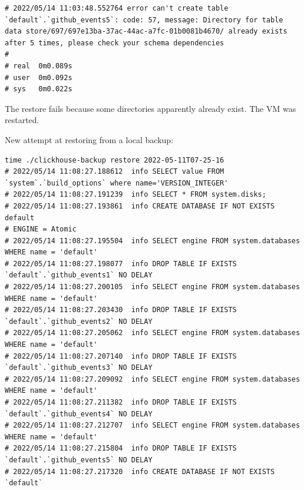 \begin{verbatim}
# 2022/05/14 11:03:48.552764 error can't create table `default`.`github_events5`: code: 57, message: Directory for table data store/697/697e13ba-37ac-44ac-a7fc-01b0081b4670/ already exists after 5 times, please check your schema dependencies
#
# real	0m0.089s
# user	0m0.092s
# sys	0m0.022s
\end{verbatim}

The restore fails because some directories apparently already exist.
The VM was restarted.

New attempt at restoring from a local backup:
\begin{verbatim}
time ./clickhouse-backup restore 2022-05-11T07-25-16
# 2022/05/14 11:08:27.188612  info SELECT value FROM `system`.`build_options` where name='VERSION_INTEGER'
# 2022/05/14 11:08:27.191239  info SELECT * FROM system.disks;
# 2022/05/14 11:08:27.193861  info CREATE DATABASE IF NOT EXISTS default
# ENGINE = Atomic
# 2022/05/14 11:08:27.195504  info SELECT engine FROM system.databases WHERE name = 'default'
# 2022/05/14 11:08:27.198077  info DROP TABLE IF EXISTS `default`.`github_events1` NO DELAY
# 2022/05/14 11:08:27.200105  info SELECT engine FROM system.databases WHERE name = 'default'
# 2022/05/14 11:08:27.203430  info DROP TABLE IF EXISTS `default`.`github_events2` NO DELAY
# 2022/05/14 11:08:27.205062  info SELECT engine FROM system.databases WHERE name = 'default'
# 2022/05/14 11:08:27.207140  info DROP TABLE IF EXISTS `default`.`github_events3` NO DELAY
# 2022/05/14 11:08:27.209092  info SELECT engine FROM system.databases WHERE name = 'default'
# 2022/05/14 11:08:27.211382  info DROP TABLE IF EXISTS `default`.`github_events4` NO DELAY
# 2022/05/14 11:08:27.212707  info SELECT engine FROM system.databases WHERE name = 'default'
# 2022/05/14 11:08:27.215804  info DROP TABLE IF EXISTS `default`.`github_events5` NO DELAY
# 2022/05/14 11:08:27.217320  info CREATE DATABASE IF NOT EXISTS `default`

\end{verbatim}
